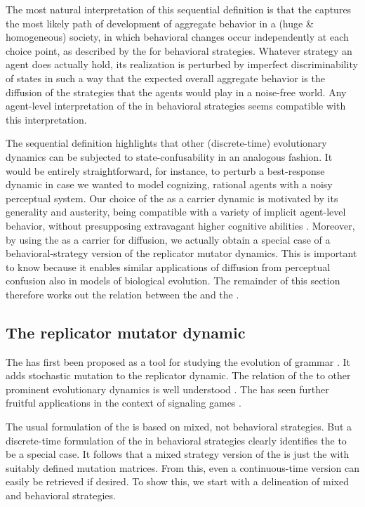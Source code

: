 \documentclass[fleqn,reqno,10pt]{article}
\newcommand{\rd}{\acro{rd}} %
\newcommand{\rmd}{\acro{rmd}} %
\newcommand{\rdd}{\acro{rdd}} %
\begin{document}
The most natural interpretation of this sequential definition is that
the \rdd captures the most likely path of development of aggregate
behavior in a (huge \& homogeneous) society, in which behavioral
changes occur independently at each choice point, as described by the
\rd for behavioral strategies. Whatever strategy an agent does
actually hold, its realization is perturbed by imperfect
discriminability of states in such a way that the expected overall
aggregate behavior is the diffusion of the strategies that the agents
would play in a noise-free world. Any agent-level interpretation of
the \rd in behavioral strategies seems compatible with this
interpretation.

The sequential definition highlights that other (discrete-time)
evolutionary dynamics can be subjected to state-confusability in an
analogous fashion. It would be entirely straightforward, for instance,
to perturb a best-response dynamic in case we wanted to model
cognizing, rational agents with a noisy perceptual system. Our choice
of the \rd as a carrier dynamic is motivated by its generality and
austerity, being compatible with a variety of implicit agent-level
behavior, without presupposing extravagant higher cognitive abilities
\citep[c.f.][]{Sandholm2013:Population-Game}. Moreover, by using the
\rd as a carrier for diffusion, we actually obtain a special case of a
behavioral-strategy version of the replicator mutator dynamics. This
is important to know because it enables similar applications of
diffusion from perceptual confusion also in models of biological
evolution. The remainder of this section therefore works out the
relation between the \rdd and the \rmd.

\subsection{The replicator mutator dynamic}
\label{sec:repl-mutat-dynam}

The \rmd has first been proposed as a tool for studying the evolution
of grammar
\citep[e.g.][]{KomarovaNiyogi2001:The-Evolutionar,NowakKomarova2001:Evolution-of-Un}. It
adds stochastic mutation to the replicator dynamic. The relation of
the \rmd to other prominent evolutionary dynamics is well understood
\citep{PageNowak2002:Unifying-Evolut}. The \rmd has seen further
fruitful applications in the context of signaling games
\citep[e.g.][]{HutteggerSkyrms2010:Evolutionary-Dy}.

The usual formulation of the \rmd is based on mixed, not behavioral
strategies. But a discrete-time formulation of the \rmd in behavioral
strategies clearly identifies the \rdd to be a special case. It
follows that a mixed strategy version of the \rdd is just the \rmd
with suitably defined mutation matrices. From this, even a
continuous-time version can easily be retrieved if desired. To show
this, we start with a delineation of mixed and behavioral strategies.
\end{document}
